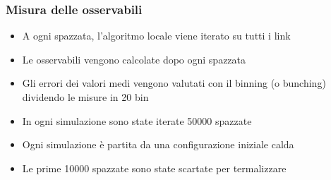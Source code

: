 \begin{frame}
    \frametitle{Misura delle osservabili}
    \begin{itemize}
        \item A ogni spazzata, l'algoritmo locale viene iterato su tutti i link
        \item Le osservabili vengono calcolate dopo ogni spazzata
        \item Gli errori dei valori medi vengono valutati con il binning (o bunching) %
            dividendo le misure in 20 bin
        \item In ogni simulazione sono state iterate 50000 spazzate
        \item Ogni simulazione è partita da una configurazione iniziale calda
        \item Le prime 10000 spazzate sono state scartate per termalizzare
    \end{itemize}
\end{frame}

